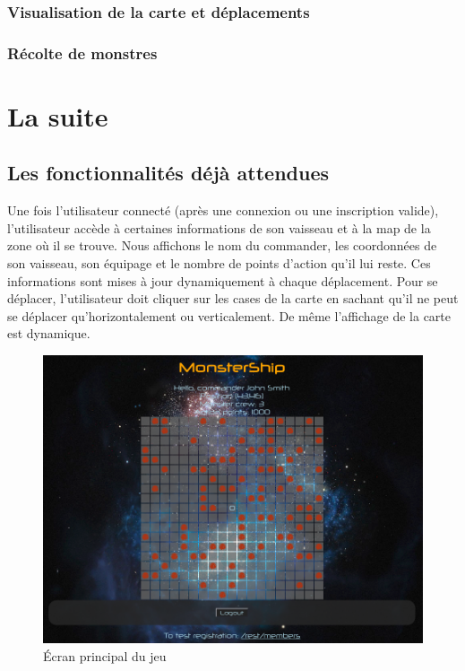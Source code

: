\documentclass[a4paper,11pt]{report}
\begin{document}
    \subsection{Visualisation de la carte et déplacements}
      

    \subsection{Récolte de monstres}

\chapter{La suite}

  \section{Les fonctionnalités déjà attendues}
      Une fois l'utilisateur connecté (après une connexion ou une inscription valide), l'utilisateur accède à certaines informations de son vaisseau et à la map de la zone où il se trouve.
      Nous affichons le nom du commander, les coordonnées de son vaisseau, son équipage et le nombre de points d'action qu'il lui reste. Ces informations sont mises à jour dynamiquement à chaque déplacement.
      Pour se déplacer, l'utilisateur doit cliquer sur les cases de la carte en sachant qu'il ne peut se déplacer qu'horizontalement ou verticalement. De même l'affichage de la carte est dynamique.
      \begin{figure}[H]
        \begin{center}
          \includegraphics[width=.8\textwidth]{images/home.png}
          \caption{Écran principal du jeu}
          \label{fig:ec_home}
        \end{center}
      \end{figure}
\end{document}
